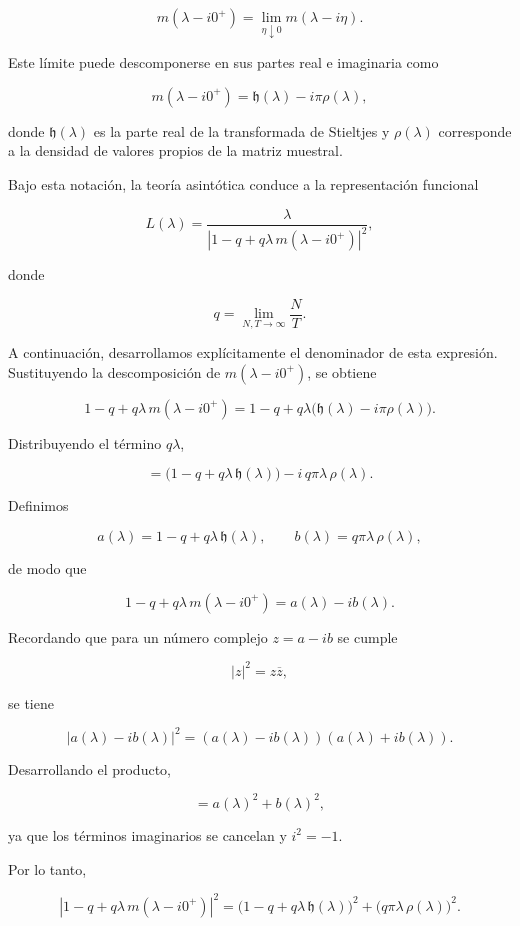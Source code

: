\documentclass[letterpaper,12pt,oneside]{book}
\begin{document}
\[
m(\lambda-i0^+)
=
\lim_{\eta\downarrow 0} m(\lambda-i\eta).
\]

Este límite puede descomponerse en sus partes real e imaginaria como

\[
m(\lambda-i0^+)=\mathfrak{h}(\lambda)-i\pi\rho(\lambda),
\]

donde $\mathfrak{h}(\lambda)$ es la parte real de la transformada de Stieltjes y $\rho(\lambda)$ corresponde a la densidad de valores propios de la matriz muestral.

Bajo esta notación, la teoría asintótica conduce a la representación funcional

\[
L(\lambda)
=
\frac{\lambda}
{\left|1-q+q\lambda\,m(\lambda-i0^+)\right|^2},
\]

donde

\[
q=\lim_{N,T\to\infty}\frac{N}{T}.
\]

A continuación, desarrollamos explícitamente el denominador de esta expresión. Sustituyendo la descomposición de $m(\lambda-i0^+)$, se obtiene

\[
1-q+q\lambda\,m(\lambda-i0^+)
=
1-q+q\lambda\bigl(\mathfrak{h}(\lambda)-i\pi\rho(\lambda)\bigr).
\]

Distribuyendo el término $q\lambda$,

\[
=
\bigl(1-q+q\lambda\,\mathfrak{h}(\lambda)\bigr)
-
i\,q\pi\lambda\,\rho(\lambda).
\]

Definimos

\[
a(\lambda)=1-q+q\lambda\,\mathfrak{h}(\lambda),
\qquad
b(\lambda)=q\pi\lambda\,\rho(\lambda),
\]

de modo que

\[
1-q+q\lambda\,m(\lambda-i0^+)=a(\lambda)-ib(\lambda).
\]

Recordando que para un número complejo $z=a-ib$ se cumple

\[
|z|^2 = z\overline{z},
\]

se tiene

\[
|a(\lambda)-ib(\lambda)|^2
=
(a(\lambda)-ib(\lambda))(a(\lambda)+ib(\lambda)).
\]

Desarrollando el producto,

\[
=
a(\lambda)^2 + b(\lambda)^2,
\]

ya que los términos imaginarios se cancelan y $i^2=-1$.

Por lo tanto,

\[
\left|1-q+q\lambda\,m(\lambda-i0^+)\right|^2
=
\bigl(1-q+q\lambda\,\mathfrak{h}(\lambda)\bigr)^2
+
\bigl(q\pi\lambda\,\rho(\lambda)\bigr)^2.
\]
\end{document}

